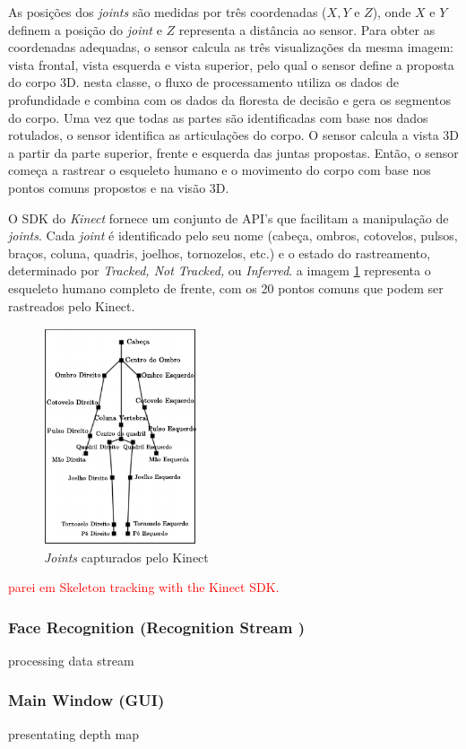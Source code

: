 As posições dos \textit{joints} são medidas por três coordenadas ($X, Y$ e $Z$), onde $X$ e $Y$ definem a posição do \textit{joint} e $Z$ representa a distância ao sensor. Para obter as coordenadas adequadas, o sensor calcula as três visualizações da mesma imagem: vista frontal, vista esquerda e vista superior, pelo qual o sensor define a proposta do corpo 3D. nesta classe, o fluxo de processamento  utiliza os dados de profundidade e combina com os dados da floresta de decisão e gera os segmentos do corpo. Uma vez que todas as partes são identificadas com base nos dados rotulados, o sensor identifica as articulações do corpo. O sensor calcula a vista 3D a partir da parte superior, frente e esquerda das juntas propostas. Então, o sensor começa a rastrear o esqueleto humano e o movimento do corpo com base nos pontos comuns propostos e na visão 3D.

O SDK do \textit{Kinect} fornece um conjunto de API's que facilitam a manipulação de \textit{joints}. Cada \textit{joint} é identificado pelo seu nome (cabeça, ombros, cotovelos, pulsos, braços, coluna, quadris, joelhos, tornozelos, etc.) e o estado do rastreamento, determinado por \textit{Tracked, Not Tracked,} ou \textit{Inferred}. a imagem \ref{fig:human_joints} representa o esqueleto humano completo de frente, com os 20 pontos comuns que podem ser rastreados pelo Kinect.


\begin{figure}[ht]
\centering
\includegraphics[width=0.4\textwidth]{images/human_joints.png}
\caption{\textit{Joints} capturados pelo Kinect}
\label{fig:human_joints}
\end{figure}


\textcolor{red}{parei em Skeleton tracking with the Kinect SDK. %
}


\subsubsection{Face Recognition (Recognition Stream )}\label{sec:depthDataRecognition}
processing data stream


\subsubsection{Main Window (GUI)}\label{sec:mainWindow}
presentating depth map